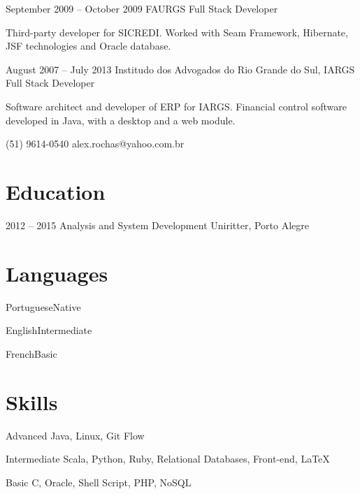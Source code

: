 \documentclass{tccv}
\begin{document}
\begin{eventlist}
\item{September 2009 -- October 2009}
    {FAURGS}
    {Full Stack Developer}

    Third-party developer for SICREDI\@. Worked with Seam Framework, Hibernate, JSF technologies and Oracle
    database.


\item{August 2007 -- July 2013}
    {Institudo dos Advogados do Rio Grande do Sul, IARGS}
    {Full Stack Developer}

    Software architect and developer of ERP for IARGS\@.
    Financial control software developed in Java, with a desktop and a web module.

\end{eventlist}

{(51) 9614-0540 }
{alex.rochas@yahoo.com.br}

\section{Education}

\begin{yearlist}

\item{2012 -- 2015}
    {Analysis and System Development}
    {Uniritter, Porto Alegre}

\end{yearlist}

\section{Languages}

\begin{factlist}
\item{Portuguese}{Native}
\item{English}{Intermediate}
\item{French}{Basic}
\end{factlist}

\section{Skills}

\begin{factlist}

\item{Advanced}
    {Java, Linux, Git Flow}

\item{Intermediate}
    {Scala, Python, Ruby, Relational Databases, Front-end, {\LaTeX}}

\item{Basic}
    {C, Oracle, Shell Script, PHP, NoSQL}

\end{factlist}
\end{document}
